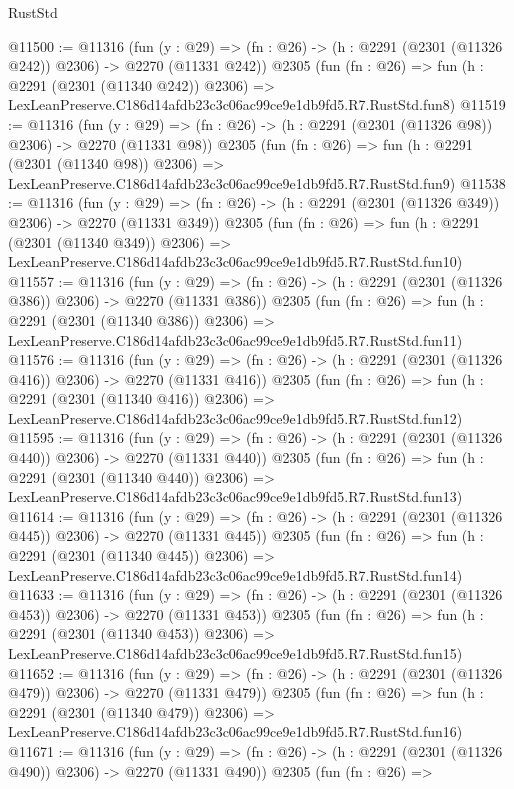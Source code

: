 \begin{lexlean}{RustStd}
\begin{coremodule}
@11500 := @11316
    (fun (y : @29) => (fn : @26) -> (h : @2291 (@2301 (@11326 @242)) @2306) -> @2270 (@11331 @242))
    @2305
    (fun (fn : @26) =>
    fun (h : @2291 (@2301 (@11340 @242)) @2306) =>
    LexLeanPreserve.C186d14afdb23c3c06ac99ce9e1db9fd5.R7.RustStd.fun8)
@11519 := @11316
    (fun (y : @29) => (fn : @26) -> (h : @2291 (@2301 (@11326 @98)) @2306) -> @2270 (@11331 @98))
    @2305
    (fun (fn : @26) =>
    fun (h : @2291 (@2301 (@11340 @98)) @2306) =>
    LexLeanPreserve.C186d14afdb23c3c06ac99ce9e1db9fd5.R7.RustStd.fun9)
@11538 := @11316
    (fun (y : @29) => (fn : @26) -> (h : @2291 (@2301 (@11326 @349)) @2306) -> @2270 (@11331 @349))
    @2305
    (fun (fn : @26) =>
    fun (h : @2291 (@2301 (@11340 @349)) @2306) =>
    LexLeanPreserve.C186d14afdb23c3c06ac99ce9e1db9fd5.R7.RustStd.fun10)
@11557 := @11316
    (fun (y : @29) => (fn : @26) -> (h : @2291 (@2301 (@11326 @386)) @2306) -> @2270 (@11331 @386))
    @2305
    (fun (fn : @26) =>
    fun (h : @2291 (@2301 (@11340 @386)) @2306) =>
    LexLeanPreserve.C186d14afdb23c3c06ac99ce9e1db9fd5.R7.RustStd.fun11)
@11576 := @11316
    (fun (y : @29) => (fn : @26) -> (h : @2291 (@2301 (@11326 @416)) @2306) -> @2270 (@11331 @416))
    @2305
    (fun (fn : @26) =>
    fun (h : @2291 (@2301 (@11340 @416)) @2306) =>
    LexLeanPreserve.C186d14afdb23c3c06ac99ce9e1db9fd5.R7.RustStd.fun12)
@11595 := @11316
    (fun (y : @29) => (fn : @26) -> (h : @2291 (@2301 (@11326 @440)) @2306) -> @2270 (@11331 @440))
    @2305
    (fun (fn : @26) =>
    fun (h : @2291 (@2301 (@11340 @440)) @2306) =>
    LexLeanPreserve.C186d14afdb23c3c06ac99ce9e1db9fd5.R7.RustStd.fun13)
@11614 := @11316
    (fun (y : @29) => (fn : @26) -> (h : @2291 (@2301 (@11326 @445)) @2306) -> @2270 (@11331 @445))
    @2305
    (fun (fn : @26) =>
    fun (h : @2291 (@2301 (@11340 @445)) @2306) =>
    LexLeanPreserve.C186d14afdb23c3c06ac99ce9e1db9fd5.R7.RustStd.fun14)
@11633 := @11316
    (fun (y : @29) => (fn : @26) -> (h : @2291 (@2301 (@11326 @453)) @2306) -> @2270 (@11331 @453))
    @2305
    (fun (fn : @26) =>
    fun (h : @2291 (@2301 (@11340 @453)) @2306) =>
    LexLeanPreserve.C186d14afdb23c3c06ac99ce9e1db9fd5.R7.RustStd.fun15)
@11652 := @11316
    (fun (y : @29) => (fn : @26) -> (h : @2291 (@2301 (@11326 @479)) @2306) -> @2270 (@11331 @479))
    @2305
    (fun (fn : @26) =>
    fun (h : @2291 (@2301 (@11340 @479)) @2306) =>
    LexLeanPreserve.C186d14afdb23c3c06ac99ce9e1db9fd5.R7.RustStd.fun16)
@11671 := @11316
    (fun (y : @29) => (fn : @26) -> (h : @2291 (@2301 (@11326 @490)) @2306) -> @2270 (@11331 @490))
    @2305
    (fun (fn : @26) =>

\end{coremodule}
\end{lexlean}
